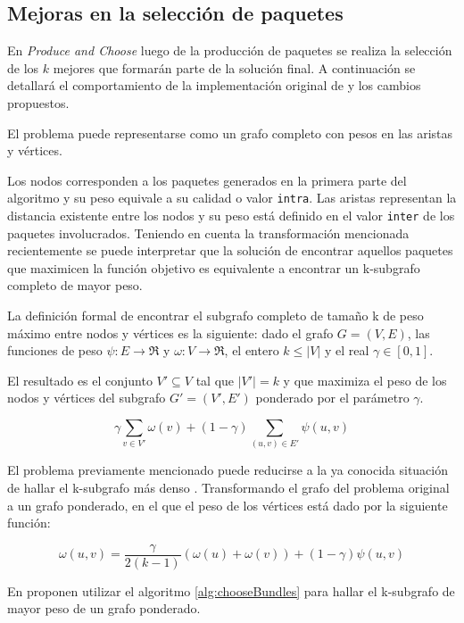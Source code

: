 \subsection{Mejoras en la selección de paquetes}
En \emph{Produce and Choose} luego de la producción de paquetes se realiza la selección de los $k$ mejores que formarán parte de la solución final. A continuación se detallará el comportamiento de la implementación original de \cite{journals/tkde/Amer-YahiaBCFMZ14} y los cambios propuestos.

El problema puede representarse como un grafo completo con pesos en las aristas y vértices. 

Los nodos corresponden a los paquetes generados en la primera parte del algoritmo y su peso equivale a su calidad o valor \texttt{intra}. Las aristas representan la distancia existente entre los nodos y su peso está definido en el valor \texttt{inter} de los paquetes involucrados. Teniendo en cuenta la transformación mencionada recientemente se puede interpretar que la solución de encontrar aquellos paquetes que maximicen la función objetivo es equivalente a encontrar un k-subgrafo completo de mayor peso.

La definición formal de encontrar el subgrafo completo de tamaño k de peso máximo entre nodos y vértices es la siguiente: dado el grafo $ G = (V,E) $, las funciones de peso $\psi : E \rightarrow \Re$ y $\omega : V \rightarrow \Re$, el entero $ k \leq |V| $ y el real $\gamma \in [0,1]$. 

El resultado es el conjunto $V' \subseteq V$ tal que $|V'| = k$ y que maximiza el peso de los nodos y vértices del subgrafo $G' = (V', E')$ ponderado por el parámetro $\gamma$.

\begin{equation}
\gamma \sum_{v \in V'}{\omega(v)} + (1 - \gamma) \sum_{(u,v) \in E'}{\psi(u,v)}
\end{equation}

El problema previamente mencionado puede reducirse a la ya conocida situación de hallar el k-subgrafo más denso \cite{DBLP:journals/algorithmica/FeigePK01}. Transformando el grafo del problema original a un grafo ponderado, en el que el peso de los vértices está dado por la siguiente función:
 
\begin{equation}
\omega(u,v) = \dfrac{\gamma}{2( k - 1)} (\omega(u) + \omega(v)) + (1 - \gamma)\psi(u,v) 
\end{equation}

En \cite{journals/tkde/Amer-YahiaBCFMZ14} proponen utilizar el algoritmo \ref{alg:chooseBundles} para hallar el k-subgrafo de mayor peso de un grafo ponderado. 

